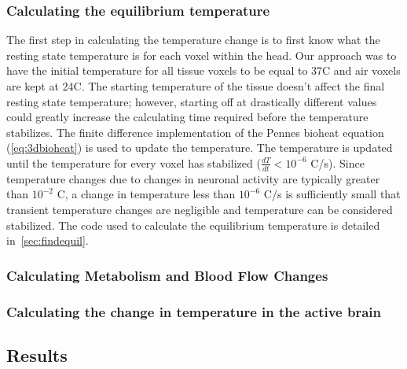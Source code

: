   
    \subsubsection{Calculating the equilibrium temperature}
  The first step in calculating the temperature change is to first know what the resting state temperature is for each voxel within the head. Our approach was to have the initial temperature for all tissue voxels to be equal to 37\degree C and air voxels are kept at 24\degree C.  The starting temperature of the tissue doesn't affect the final resting state temperature; however, starting off at drastically different values could greatly increase the calculating time required before the temperature stabilizes. The finite difference implementation of the Pennes bioheat equation (\cref{eq:3dbioheat}) is used to update the temperature.  The temperature is updated until the temperature for every voxel has stabilized ($\frac{dT}{dt} < 10^{-6}$ \degree C/s).  Since temperature changes due to changes in neuronal activity are typically greater than $10^{-2}$ \degree C, a change in temperature less than $10^{-6}$ \degree C/s is sufficiently small that transient temperature changes are negligible and temperature can be considered stabilized.  The code used to calculate the equilibrium temperature is detailed in~\cref{sec:findequil}.
  
    \subsubsection{Calculating Metabolism and Blood Flow Changes}
    \label{sss:calcmf}
    \subsubsection{Calculating the change in temperature in the active brain}
  \subsection{Results}
  \label{sec:results}
